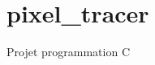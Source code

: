 \chapter{pixel\+\_\+tracer }
\hypertarget{md__r_e_a_d_m_e}{}\label{md__r_e_a_d_m_e}
\label{md__r_e_a_d_m_e_autotoc_md0}%
%


Projet programmation C 
